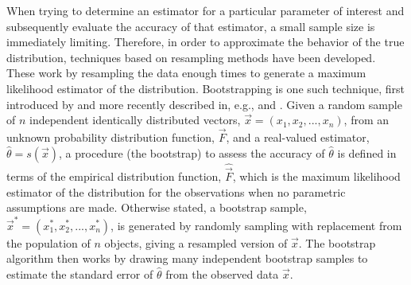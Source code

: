 \documentclass[referee]{aa}
\begin{document}
When trying to determine an estimator for a particular parameter of interest and subsequently evaluate the accuracy of that estimator, a small sample size is immediately limiting. Therefore, in order to approximate the behavior of the true distribution, techniques based on resampling methods have been developed. These work by resampling the data enough times to generate a maximum likelihood estimator of the distribution. Bootstrapping is one such technique, first introduced by \citet{Efron:1979p1831} and more recently described in, e.g., \citet{1994.book.Efron} and \citet{Chernick1999}. Given a random sample of $n$ independent identically distributed vectors, $\vec{x} = \left( x_1, x_2, ..., x_n \right)$, from an unknown probability distribution function, $\vec{F}$, and a real-valued estimator, $\hat{\theta} = s \left( \vec{x} \right)$, a procedure (the bootstrap) to assess the accuracy of $\hat{\theta}$ is defined in terms of the empirical distribution function, $\hat{\vec{F}}$, which is the maximum likelihood estimator of the distribution for the observations when no parametric assumptions are made. Otherwise stated, a bootstrap sample, $\vec{x}^* = \left( x_1^*, x_2^*, ..., x_n^* \right)$, is generated by randomly sampling with replacement from the population of $n$ objects, giving a resampled version of $\vec{x}$. The bootstrap algorithm then works by drawing many independent bootstrap samples to estimate the standard error of $\hat{\theta}$ from the observed data $\vec{x}$.
\end{document}
